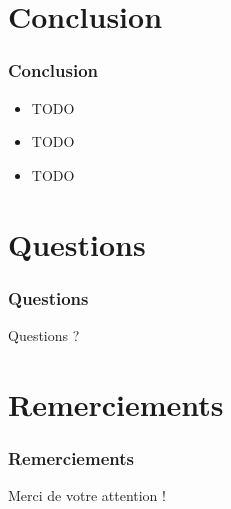 \documentclass{beamer}
\begin{document}
\section{Conclusion}
\begin{frame}
 \frametitle{Conclusion}
 \begin{itemize}
  \item TODO
  \item TODO
  \item TODO
 \end{itemize}
\end{frame}

\section*{Questions}
\begin{frame}
\frametitle{Questions}
Questions ?
\end{frame}

\section*{Remerciements}
\begin{frame}
 \frametitle{Remerciements}
 Merci de votre attention !
\end{frame}
\end{document}
